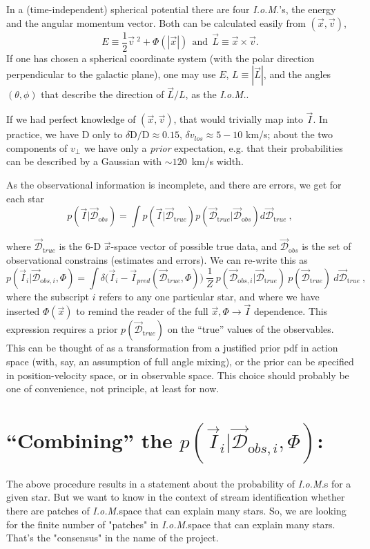 \documentclass[12pt,a4paper,twoside]{article}
\newcommand{\D}{{\mathrm D}}
\newcommand{\dD}{\delta{\mathrm D}}
\newcommand{\vlos}{v_{los}}
\newcommand{\dvlos}{\delta\vlos}
\newcommand{\vperp}{v_\perp}
\newcommand{\vx}{\vec{x}}
\newcommand{\vv}{\vec{v}}
\newcommand{\xv}{(\vx,\vv)}
\newcommand{\vI}{\vec{I}}
\newcommand{\IoM}{{\sl I.o.M.}}
\newcommand{\vL}{\vec{L}}
\newcommand{\dtrue}{\vec{\mathcal D}_{\mathrm true}}
\newcommand{\dobs}{\vec{\mathcal D}_{\mathrm obs}}
\newcommand{\vIi}{\vec{I}_i}
\newcommand{\dobsi}{\vec{\mathcal D}_{{\mathrm obs},i}}
\begin{document}
In a (time-independent) spherical potential there are four \IoM 's, the energy and the angular momentum vector. Both can be calculated easily from $\xv$, 
$$E\equiv \frac{1}{2}\vv\ ^2+\Phi (|\vx |)\ \ {\mathrm{and}}\ \ \vL\equiv \vx \times \vv .$$
If one has chosen a spherical coordinate system (with the polar direction perpendicular to the galactic plane), one may use $E$, $L\equiv |\vL |$, and the angles $(\theta,\phi)$ that describe 
the direction of $\vL / L$, as the \IoM .

If we had perfect knowledge of $\xv$, that would trivially map into $\vI$. In practice, we have 
$\D$ only to $\dD / \D \approx 0.15$, $\dvlos \approx 5-10$ km/s; about the two components of $\vperp$ we have only a {\it prior} expectation, e.g. that their probabilities can be described by a Gaussian with $\sim 120$~km/s width.

As the observational information is incomplete, and there are errors, we get for each star
$$p(\vI | \dobs )={\displaystyle \int p(\vI | \dtrue) p(\dtrue | \dobs ) d \dtrue }\ ,$$

where $\dtrue$ is the 6-D $\vx$-space vector of possible true data, and $\dobs$ is the set 
of observational constrains (estimates and errors). We can re-write this as
$$p(\vIi | \dobsi,\Phi )={\displaystyle \int \delta \bigl( \vIi - \vI_{pred}(\dtrue,\Phi )\bigr ) 
\ \frac{1}{Z}\ p(\dobsi | \dtrue )\  p(\dtrue )\ d \dtrue }\ ,$$
where the subscript $i$ refers to any one particular star, and where we have inserted $\Phi (\vx)$
to remind the reader of the full $\vx ,\Phi \rightarrow \vI$ dependence.
This expression requires a prior $p(\dtrue)$ on the ``true'' values of the observables.
This can be thought of as a transformation from a justified prior pdf in action space
(with, say, an assumption of full angle mixing),
or the prior can be specified in position-velocity space, or in observable space.
This choice should probably be one of convenience, not principle, at least for now.

\section{``Combining'' the $p(\vIi | \dobsi,\Phi )$:}

The above procedure results in a statement about the probability of \IoM s for a given star. But we want to know in the context of stream identification whether there are patches of \IoM space that can explain many stars. So, we are looking for the finite number of "patches" in \IoM space that 
can explain many stars.  That's the "consensus" in the name of the project.
\end{document}
